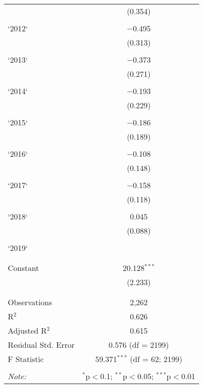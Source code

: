 \begin{table}[!htbp]
\begin{tabular}{@{\extracolsep{5pt}}lc}
  & (0.354) \\ 
  & \\ 
 `2012` & $-$0.495 \\ 
  & (0.313) \\ 
  & \\ 
 `2013` & $-$0.373 \\ 
  & (0.271) \\ 
  & \\ 
 `2014` & $-$0.193 \\ 
  & (0.229) \\ 
  & \\ 
 `2015` & $-$0.186 \\ 
  & (0.189) \\ 
  & \\ 
 `2016` & $-$0.108 \\ 
  & (0.148) \\ 
  & \\ 
 `2017` & $-$0.158 \\ 
  & (0.118) \\ 
  & \\ 
 `2018` & 0.045 \\ 
  & (0.088) \\ 
  & \\ 
 `2019` &  \\ 
  &  \\ 
  & \\ 
 Constant & 20.128$^{***}$ \\ 
  & (2.233) \\ 
  & \\ 
\hline \\[-1.8ex] 
Observations & 2,262 \\ 
R$^{2}$ & 0.626 \\ 
Adjusted R$^{2}$ & 0.615 \\ 
Residual Std. Error & 0.576 (df = 2199) \\ 
F Statistic & 59.371$^{***}$ (df = 62; 2199) \\ 
\hline 
\hline \\[-1.8ex] 
\textit{Note:}  & \multicolumn{1}{r}{$^{*}$p$<$0.1; $^{**}$p$<$0.05; $^{***}$p$<$0.01} \\ 
\end{tabular} 
\end{table} 
